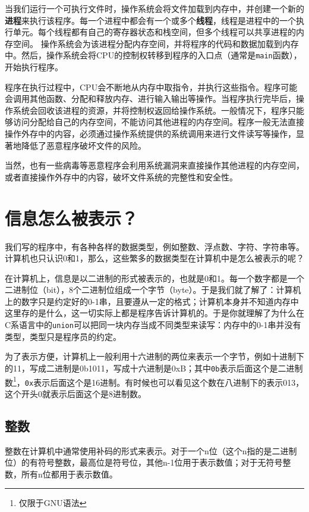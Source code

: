 \documentclass[../main.tex]{subfiles}
\begin{document}
当我们运行一个可执行文件时，操作系统会将文件加载到内存中，并创建一个新的\textbf{进程}来执行该程序。每一个进程中都会有一个或多个\textbf{线程}，线程是进程中的一个执行单元。每个线程都有自己的寄存器状态和栈空间，但多个线程可以共享进程的内存空间。
操作系统会为该进程分配内存空间，并将程序的代码和数据加载到内存中。然后，操作系统会将CPU的控制权转移到程序的入口点（通常是\texttt{main}函数），开始执行程序。

程序在执行过程中，CPU会不断地从内存中取指令，并执行这些指令。程序可能会调用其他函数、分配和释放内存、进行输入输出等操作。当程序执行完毕后，操作系统会回收该进程的资源，并将控制权返回给操作系统。一般情况下，程序只能够访问分配给自己的内存空间，不能访问其他进程的内存空间。程序一般无法直接操作外存中的内容，必须通过操作系统提供的系统调用来进行文件读写等操作，显著地降低了恶意程序破坏文件的风险。

当然，也有一些病毒等恶意程序会利用系统漏洞来直接操作其他进程的内存空间，或者直接操作外存中的内容，破坏文件系统的完整性和安全性。

\section{信息怎么被表示？}

我们写的程序中，有各种各样的数据类型，例如整数、浮点数、字符、字符串等。计算机也只认识0和1，那么，这些繁多的数据类型在计算机中是怎么被表示的呢？

在计算机上，信息是以二进制的形式被表示的，也就是0和1。每一个数字都是一个二进制位（bit），8个二进制位组成一个字节（byte）。于是我们就了解了：计算机上的数字只是约定好的0-1串，且要遵从一定的格式；计算机本身并不知道内存中这里存的是什么，这一切实际上都是程序告诉计算机的。于是你就理解了为什么在C系语言中的\texttt{union}可以把同一块内存当成不同类型来读写：内存中的0-1串并没有类型，类型只是程序员的约定。

为了表示方便，计算机上一般利用十六进制的两位来表示一个字节，例如十进制下的11，写成二进制是0b1011，写成十六进制是0xB；其中\texttt{0b}表示后面这个是二进制数\footnote{仅限于GNU语法}，\texttt{0x}表示后面这个是16进制。有时候也可以看见这个数在八进制下的表示013，这个开头0就表示后面这个是8进制数。

\subsection{整数}
整数在计算机中通常使用补码的形式来表示。对于一个n位（这个n指的是二进制位）的有符号整数，最高位是符号位，其他n-1位用于表示数值；对于无符号整数，所有n位都用于表示数值。
\end{document}

